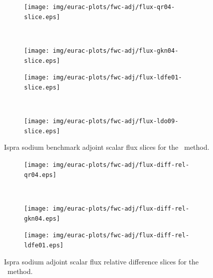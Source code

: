 \clearpage
\begin{figure}[!htb]
\begin{subfigure}{\textwidth}
\centering
\texttt{[image: img/eurac-plots/fwc-adj/flux-qr04-slice.eps]}
\end{subfigure}
\\
\begin{subfigure}{\textwidth}
\centering
\texttt{[image: img/eurac-plots/fwc-adj/flux-gkn04-slice.eps]}
\end{subfigure}
\end{figure}
\clearpage
\begin{figure}[!htb]
\ContinuedFloat
\begin{subfigure}{\textwidth}
\centering
\texttt{[image: img/eurac-plots/fwc-adj/flux-ldfe01-slice.eps]}
\end{subfigure}
\\
\begin{subfigure}{\textwidth}
\centering
\texttt{[image: img/eurac-plots/fwc-adj/flux-ldo09-slice.eps]}
\end{subfigure}
\caption{Ispra sodium benchmark adjoint scalar flux slices for the \fwc\ method.}
\label{eurac-fwc-slices}
\end{figure}

\clearpage
\begin{figure}[!htb]
\begin{subfigure}{\textwidth}
\centering
\texttt{[image: img/eurac-plots/fwc-adj/flux-diff-rel-qr04.eps]}
\end{subfigure}
\\
\begin{subfigure}{\textwidth}
\centering
\texttt{[image: img/eurac-plots/fwc-adj/flux-diff-rel-gkn04.eps]}
\end{subfigure}
\end{figure}
\clearpage
\begin{figure}[!htb]
\ContinuedFloat
\begin{subfigure}{\textwidth}
\centering
\texttt{[image: img/eurac-plots/fwc-adj/flux-diff-rel-ldfe01.eps]}
\end{subfigure}
\caption{Ispra sodium adjoint scalar flux relative difference slices for the \fwc\ 
         method.}
\label{eurac-fwc-diff-rel}
\end{figure}

